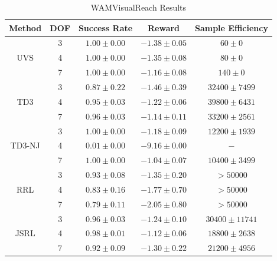 \documentclass[letterpaper, 10 pt, conference]{ieeeconf}  %
\begin{document}
\begin{table}[h] \caption{WAMVisualReach Results} \label{tab:results}
    \begin{center}
        \begin{tabular}{|c|c|c|c|c|}
            \hline
            Method & DOF & Success Rate & Reward & Sample Efficiency  \\
            \hline
            \multirow{3}{*}{UVS} & 3 & $1.00 \pm 0.00$ & $-1.38 \pm 0.05$  & $60 \pm 0$ \\ \cline{2-5}
                                 & 4 & $1.00 \pm 0.00$ & $-1.35 \pm 0.08$ & $80 \pm 0$ \\ \cline{2-5}
                                 & 7 & $1.00 \pm 0.00$ & $-1.16 \pm 0.08$ & $140 \pm 0$\\
            \hline
            \multirow{3}{*}{TD3} & 3 & $0.87 \pm 0.22$ & $-1.46 \pm 0.39 $ & $32400 \pm 7499$ \\ \cline{2-5}
                                 & 4 & $0.95 \pm 0.03$ & $-1.22 \pm 0.06$ & $39800 \pm 6431$ \\ \cline{2-5}
                                 & 7 & $0.96 \pm 0.03$ & $-1.14	\pm 0.11$ & $33200 \pm 2561$ \\
            \hline
            \multirow{3}{*}{TD3-NJ} & 3 & $1.00 \pm 0.00$ & $-1.18 \pm 0.09$ & $12200 \pm 1939$ \\ \cline{2-5}
                                 & 4 & $0.01 \pm 0.00$ & $-9.16 \pm 0.00$ & $-$ \\ \cline{2-5}
                                 & 7 & $1.00 \pm 0.00$ & $-1.04 \pm 0.07$ & $10400 \pm 3499$ \\
            \hline
            \multirow{3}{*}{RRL} & 3 & $0.93 \pm 0.08$ & $-1.35 \pm 0.20 $ & $> 50000$ \\ \cline{2-5}
                                 & 4 & $0.83 \pm 0.16$ & $-1.77 \pm 0.70 $ & $> 50000$ \\ \cline{2-5}
                                 & 7 & $0.79 \pm 0.11$ & $-2.05 \pm 0.80 $ & $> 50000$ \\
            \hline
            \multirow{3}{*}{JSRL} & 3 & $0.96 \pm 0.03$ & $-1.24 \pm 0.10$ & $30400 \pm 11741$ \\ \cline{2-5}
                                 & 4 & $0.98 \pm 0.01$ & $-1.12 \pm 0.06$ & $18800 \pm 2638$ \\ \cline{2-5}
                                 & 7 & $0.92 \pm 0.09$ & $-1.30 \pm 0.22$ & $21200 \pm 4956$ \\
            \hline
        \end{tabular}
    \end{center}
\end{table}
\end{document}
